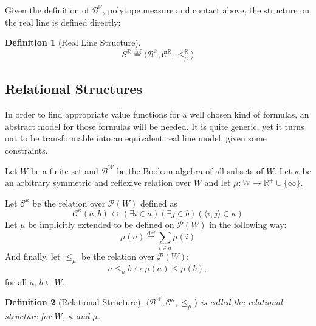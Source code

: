 \documentclass{article}
\newtheorem*{definition}{Definition}
\newcommand{\R}{\mathbb{R}}
\newcommand{\pwrset}{\mathcal{P}}
\newcommand{\B}{\mathcal{B}}
\newcommand{\bcont}{\mathcal{C}^\R}
\newcommand{\bmeasure}{\leq_\mu^\R}
\newcommand{\eqdef}{\stackrel{\text{def}}{=}}
\begin{document}
Given the definition of $\B^\R$, polytope measure and contact above, the structure on the real line is defined directly:

\begin{definition}[Real Line Structure]
  \begin{equation*}
    S^\R \eqdef \langle \B^\R, \bcont, \bmeasure \rangle
  \end{equation*}
\end{definition}

\subsection{Relational Structures}
In order to find appropriate value functions for a well chosen kind of formulas, an abstract model for those formulas will be needed. It is quite generic, yet it turns out to be transformable into an equivalent real line model, given some constraints.

Let $W$ be a finite set and $\B^W$ be the Boolean algebra of all subsets of $W$. Let $\kappa$ be an arbitrary symmetric and reflexive relation over $W$ and let $\mu: W \rightarrow \R^+ \cup \{\infty\}$.

Let $\mathcal{C}^\kappa$ be the relation over $\pwrset(W)$ defined as
\begin{equation*}
  \mathcal{C}^\kappa(a, b) \leftrightarrow (\exists i \in a)(\exists j \in b)(\langle i, j \rangle \in \kappa)
\end{equation*}
Let $\mu$ be implicitly extended to be defined on $\pwrset(W)$ in the following way:
\begin{equation*}
  \mu(a) \eqdef \sum_{i \in a}\mu(i)
\end{equation*}
And finally, let $\leq_\mu$ be the relation over $\pwrset(W)$:
\begin{equation*}
  a \leq_\mu b \leftrightarrow \mu(a) \leq \mu(b),
\end{equation*}
for all $a$, $b \subseteq W$.
\begin{definition}[Relational Structure]
$\langle \B^W, \mathcal{C}^\kappa, \leq_\mu \rangle$ is called the \emph{relational structure for $W$, $\kappa$ and $\mu$}.
\end{definition}
\end{document}
